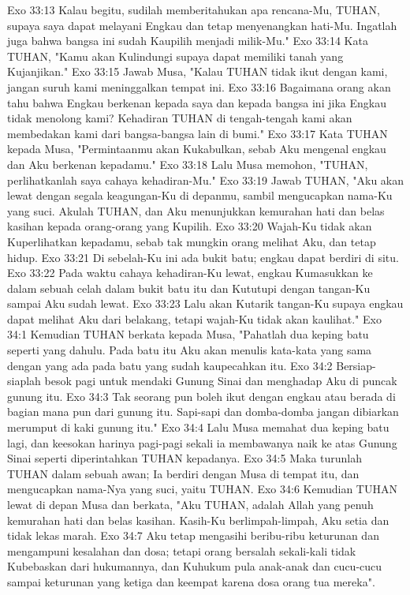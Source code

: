 Exo 33:13  Kalau begitu, sudilah memberitahukan apa rencana-Mu, TUHAN, supaya saya dapat melayani Engkau dan tetap menyenangkan hati-Mu. Ingatlah juga bahwa bangsa ini sudah Kaupilih menjadi milik-Mu."
Exo 33:14  Kata TUHAN, "Kamu akan Kulindungi supaya dapat memiliki tanah yang Kujanjikan."
Exo 33:15  Jawab Musa, "Kalau TUHAN tidak ikut dengan kami, jangan suruh kami meninggalkan tempat ini.
Exo 33:16  Bagaimana orang akan tahu bahwa Engkau berkenan kepada saya dan kepada bangsa ini jika Engkau tidak menolong kami? Kehadiran TUHAN di tengah-tengah kami akan membedakan kami dari bangsa-bangsa lain di bumi."
Exo 33:17  Kata TUHAN kepada Musa, "Permintaanmu akan Kukabulkan, sebab Aku mengenal engkau dan Aku berkenan kepadamu."
Exo 33:18  Lalu Musa memohon, "TUHAN, perlihatkanlah saya cahaya kehadiran-Mu."
Exo 33:19  Jawab TUHAN, "Aku akan lewat dengan segala keagungan-Ku di depanmu, sambil mengucapkan nama-Ku yang suci. Akulah TUHAN, dan Aku menunjukkan kemurahan hati dan belas kasihan kepada orang-orang yang Kupilih.
Exo 33:20  Wajah-Ku tidak akan Kuperlihatkan kepadamu, sebab tak mungkin orang melihat Aku, dan tetap hidup.
Exo 33:21  Di sebelah-Ku ini ada bukit batu; engkau dapat berdiri di situ.
Exo 33:22  Pada waktu cahaya kehadiran-Ku lewat, engkau Kumasukkan ke dalam sebuah celah dalam bukit batu itu dan Kututupi dengan tangan-Ku sampai Aku sudah lewat.
Exo 33:23  Lalu akan Kutarik tangan-Ku supaya engkau dapat melihat Aku dari belakang, tetapi wajah-Ku tidak akan kaulihat."
Exo 34:1  Kemudian TUHAN berkata kepada Musa, "Pahatlah dua keping batu seperti yang dahulu. Pada batu itu Aku akan menulis kata-kata yang sama dengan yang ada pada batu yang sudah kaupecahkan itu.
Exo 34:2  Bersiap-siaplah besok pagi untuk mendaki Gunung Sinai dan menghadap Aku di puncak gunung itu.
Exo 34:3  Tak seorang pun boleh ikut dengan engkau atau berada di bagian mana pun dari gunung itu. Sapi-sapi dan domba-domba jangan dibiarkan merumput di kaki gunung itu."
Exo 34:4  Lalu Musa memahat dua keping batu lagi, dan keesokan harinya pagi-pagi sekali ia membawanya naik ke atas Gunung Sinai seperti diperintahkan TUHAN kepadanya.
Exo 34:5  Maka turunlah TUHAN dalam sebuah awan; Ia berdiri dengan Musa di tempat itu, dan mengucapkan nama-Nya yang suci, yaitu TUHAN.
Exo 34:6  Kemudian TUHAN lewat di depan Musa dan berkata, "Aku TUHAN, adalah Allah yang penuh kemurahan hati dan belas kasihan. Kasih-Ku berlimpah-limpah, Aku setia dan tidak lekas marah.
Exo 34:7  Aku tetap mengasihi beribu-ribu keturunan dan mengampuni kesalahan dan dosa; tetapi orang bersalah sekali-kali tidak Kubebaskan dari hukumannya, dan Kuhukum pula anak-anak dan cucu-cucu sampai keturunan yang ketiga dan keempat karena dosa orang tua mereka".
